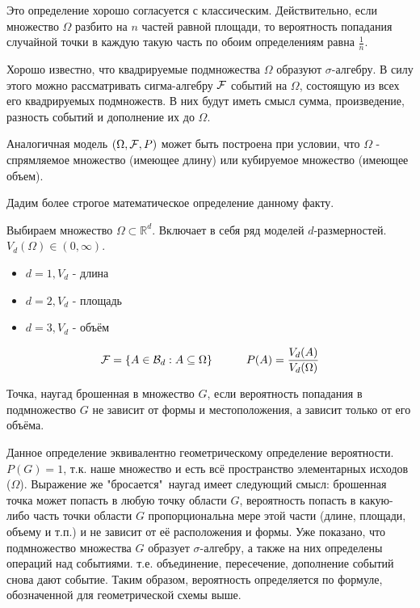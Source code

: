 Это определение хорошо согласуется с классическим. Действительно, если множество $\Omega$ разбито на $n$ частей равной площади, то вероятность попадания случайной точки в каждую такую часть по обоим определениям равна $\frac{1}{n}$.

Хорошо известно, что квадрируемые подмножества $\Omega$ образуют $\sigma$-алгебру. В силу этого можно рассматривать сигма-алгебру ${\mathcal F}$ событий на $\Omega$, состоящую из всех его квадрируемых подмножеств. В них будут иметь смысл сумма, произведение, разность событий и дополнение их до $\Omega$.

Аналогичная модель $(\Omega, {\mathcal F}, P)$ может быть построена при условии, что $\Omega$ - спрямляемое множество (имеющее длину) или кубируемое множество (имеющее объем).

Дадим более строгое математическое определение данному факту.

Выбираем множество $\Omega \subset\mathbb{R}^d$. Включает в себя ряд моделей $d$-размерностей. $V_d(\Omega) \in (0, \infty)$.

\begin{itemize}
	\item $d = 1, V_d$ - длина
	\item $d = 2, V_d$ - площадь
	\item $d = 3, V_d$ - объём
\end{itemize}

\[ {\mathcal F} = \{ A \in \mathcal{B}_d : A \subseteq \Omega \} ~~~~~~~~~ P(A) = \frac{V_d (A)}{V_d (\Omega)} \]

\begin{definition}
	Точка, наугад брошенная в множество $G$, если вероятность попадания в подмножество $G$ не зависит от формы и местоположения, а зависит только от его объёма.
\end{definition}

Данное определение эквивалентно геометрическому определение вероятности. $P(G) = 1$, т.к. наше множество и есть всё пространство элементарных исходов ($\Omega$). Выражение же "бросается"\, наугад имеет следующий смысл: брошенная точка может попасть в любую точку области $G$, вероятность попасть в какую-либо часть точки области $G$ пропорциональна мере этой части (длине, площади, объему и т.п.) и не зависит от её расположения и формы. Уже показано, что подмножество множества $G$ образует $\sigma$-алгебру, а также на них определены операций над событиями. т.е. объединение, пересечение, дополнение событий снова дают событие. Таким образом, вероятность определяется по формуле, обозначенной для геометрической схемы выше.

